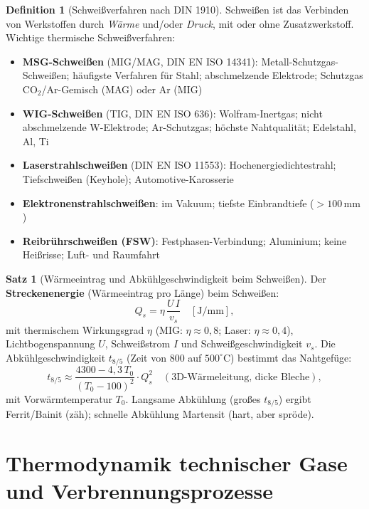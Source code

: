﻿\documentclass[a4paper,12pt]{report}
\theoremstyle{definition}
\newtheorem{definition}{Definition}
\newtheorem{satz}{Satz}
\begin{document}
\begin{definition}[Schweißverfahren nach DIN 1910]
Schweißen ist das Verbinden von Werkstoffen durch \emph{Wärme}
und/oder \emph{Druck}, mit oder ohne Zusatzwerkstoff.
Wichtige thermische Schweißverfahren:
\begin{itemize}
    \item[-] \textbf{MSG-Schweißen} (MIG/MAG, DIN EN ISO 14341):
          Metall-Schutzgas-Schweißen; häufigste Verfahren für Stahl;
          abschmelzende Elektrode; Schutzgas CO$_2$/Ar-Gemisch (MAG) oder Ar (MIG)
    \item[-] \textbf{WIG-Schweißen} (TIG, DIN EN ISO 636):
          Wolfram-Inertgas; nicht abschmelzende W-Elektrode; Ar-Schutzgas;
          höchste Nahtqualität; Edelstahl, Al, Ti
    \item[-] \textbf{Laserstrahlschweißen} (DIN EN ISO 11553):
          Hochenergiedichtestrahl; Tiefschweißen (Keyhole); Automotive-Karosserie
    \item[-] \textbf{Elektronenstrahlschweißen}: im Vakuum; tiefste Einbrandtiefe ($> 100\,\mathrm{mm}$)
    \item[-] \textbf{Reibrührschweißen (FSW)}: Festphasen-Verbindung;
          Aluminium; keine Heißrisse; Luft- und Raumfahrt
\end{itemize}
\end{definition}

\begin{satz}[Wärmeeintrag und Abkühlgeschwindigkeit beim Schweißen]
Der \textbf{Streckenenergie} (Wärmeeintrag pro Länge) beim Schweißen:
\[
  Q_s = \eta\,\frac{U\,I}{v_s} \quad [\mathrm{J/mm}],
\]
mit thermischem Wirkungsgrad $\eta$ (MIG: $\eta \approx 0{,}8$;
Laser: $\eta \approx 0{,}4$), Lichtbogenspannung $U$, Schweißstrom $I$
und Schweißgeschwindigkeit $v_s$.
Die Abkühlgeschwindigkeit $t_{8/5}$ (Zeit von $800$ auf $500^\circ\mathrm{C}$)
bestimmt das Nahtgefüge:
\[
  t_{8/5} \approx \frac{4300 - 4{,}3\,T_0}{(T_0 - 100)^2}\cdot Q_s^2
  \quad (\text{3D-Wärmeleitung, dicke Bleche}),
\]
mit Vorwärmtemperatur $T_0$. Langsame Abkühlung (großes $t_{8/5}$) ergibt
Ferrit/Bainit (zäh); schnelle Abkühlung Martensit (hart, aber spröde).
\end{satz}



\section{Thermodynamik technischer Gase und Verbrennungsprozesse}
\end{document}
